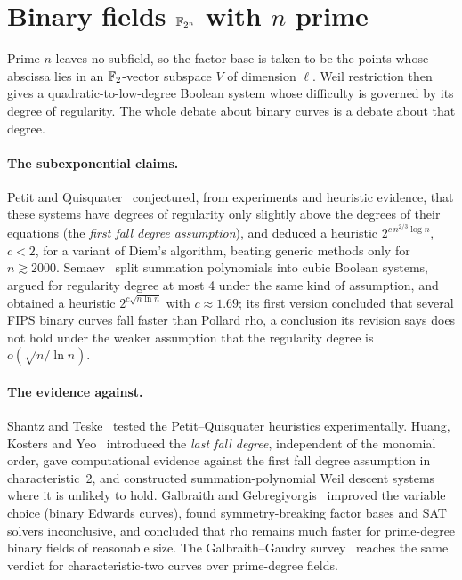 \section{Binary fields $\mathbb{F}_{2^n}$ with $n$ prime}

Prime $n$ leaves no subfield, so the factor base is taken to be the points
whose abscissa lies in an $\mathbb{F}_2$-vector subspace $V$ of dimension $\ell$.
Weil restriction then gives a quadratic-to-low-degree Boolean system whose
difficulty is governed by its degree of regularity. The whole debate about
binary curves is a debate about that degree.

\paragraph{The subexponential claims.} Petit and
Quisquater~\cite{petit2012} conjectured, from experiments and heuristic
evidence, that these systems have degrees of regularity only slightly above
the degrees of their equations (the \emph{first fall degree assumption}),
and deduced a heuristic $2^{c\,n^{2/3}\log n}$, $c<2$, for a variant of
Diem's algorithm, beating generic methods only for $n\gtrsim2000$.
Semaev~\cite{semaev2015} split summation polynomials into cubic Boolean
systems, argued for regularity degree at most 4 under the same kind of
assumption, and obtained a heuristic $2^{c\sqrt{n\ln n}}$ with
$c\approx1.69$; its first version concluded that several FIPS binary curves
fall faster than Pollard rho, a conclusion its revision says does not hold
under the weaker assumption that the regularity degree is
$o(\sqrt{n/\ln n})$.

\paragraph{The evidence against.} Shantz and Teske~\cite{shantz2013}
tested the Petit--Quisquater heuristics experimentally. Huang, Kosters and
Yeo~\cite{hky2015} introduced the \emph{last fall degree}, independent of
the monomial order, gave computational evidence against the first fall
degree assumption in characteristic~2, and constructed summation-polynomial
Weil descent systems where it is unlikely to hold. Galbraith and
Gebregiyorgis~\cite{galbraith2014} improved the variable choice (binary
Edwards curves), found symmetry-breaking factor bases and SAT solvers
inconclusive, and concluded that rho remains much faster for prime-degree
binary fields of reasonable size. The Galbraith--Gaudry
survey~\cite{galbraith2016} reaches the same verdict for characteristic-two
curves over prime-degree fields.

